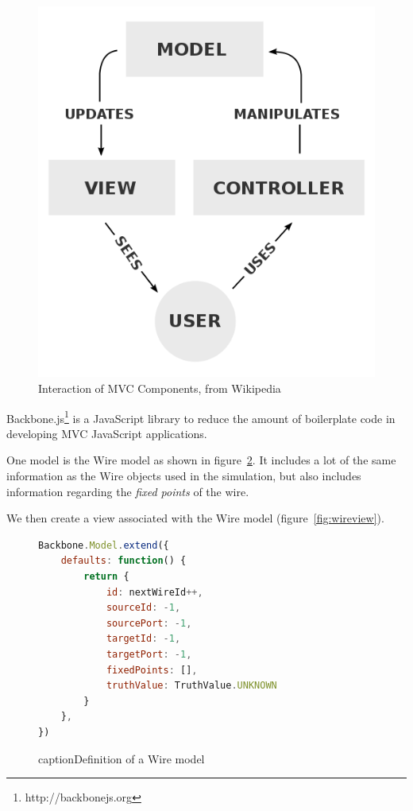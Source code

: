 \begin{figure}
	\centering
	\includegraphics[width=(\textwidth * 0.5)]{mvc.png}
	\caption{Interaction of MVC Components, from Wikipedia}
	\label{fig:mvc}
\end{figure}

Backbone.js\footnote{http://backbonejs.org} is a JavaScript library to reduce the amount of boilerplate code in developing MVC JavaScript applications.

One model is the Wire model as shown in figure~\ref{fig:wiremodel}. It includes a lot of the same information as the Wire objects used in the simulation, but also includes information regarding the \textit{fixed points} of the wire.

We then create a view associated with the Wire model (figure~\ref{fig:wireview}). 

\begin{figure}
\begin{lstlisting}[language=JavaScript]
Backbone.Model.extend({
	defaults: function() {
    	return {
        	id: nextWireId++,
        	sourceId: -1,
        	sourcePort: -1,
       	 	targetId: -1,
        	targetPort: -1,
        	fixedPoints: [],
        	truthValue: TruthValue.UNKNOWN
    	}
	},
})
\end{lstlisting}
caption{Definition of a Wire model}
\label{fig:wiremodel}
\end{figure}

